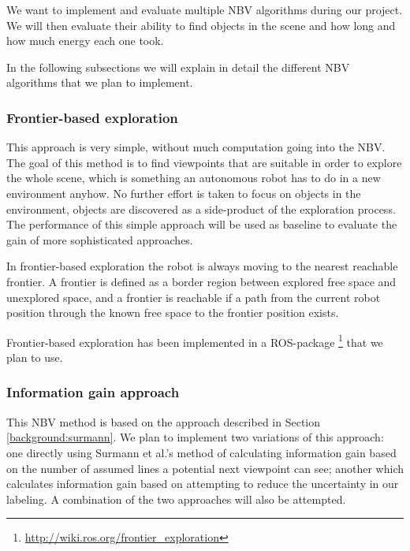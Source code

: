 \documentclass[a4paper,11pt,english]{article}
\begin{document}
We want to implement and evaluate multiple NBV algorithms during our project.
We will then evaluate their ability to find objects in the scene and how long and how much energy each one took.

In the following subsections we will explain in detail the different NBV algorithms that we plan to implement.

\subsubsection{Frontier-based exploration}
This approach is very simple, without much computation going into the NBV.
The goal of this method is to find viewpoints that are suitable in order to explore the whole scene, which is something an autonomous robot has to do in a new environment anyhow.
No further effort is taken to focus on objects in the environment, objects are discovered as a side-product of the exploration process.
The performance of this simple approach will be used as baseline to evaluate the gain of more sophisticated approaches.

In frontier-based exploration the robot is always moving to the nearest reachable frontier.
A frontier is defined as a border region between explored free space and unexplored space, and a frontier is reachable if a path from the current robot position through the known free space to the frontier position exists.

Frontier-based exploration has been implemented in a ROS-package \footnote{\url{http://wiki.ros.org/frontier_exploration}} that we plan to use.

\subsubsection{Information gain approach}
This NBV method is based on the approach described in Section \ref{background:surmann}.
We plan to implement two variations of this approach: one directly using Surmann et al.'s method of calculating information gain based on the number of assumed lines a potential next viewpoint can see; another which calculates information gain based on attempting to reduce the uncertainty in our labeling.
A combination of the two approaches will also be attempted.
\end{document}
